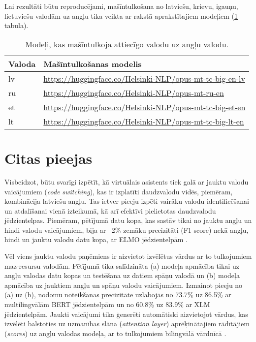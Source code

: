 Lai rezultāti būtu reproducējami, mašīntulkošana no latviešu, krievu, igauņu, lietuviešu valodām uz angļu tika veikta ar \cite{tiedemann-2020} rakstā aprakstītajiem modeļiem (\ref{tab:machine-translation} tabula).



\begin{table}[htbp]
  \centering
  \caption{Modeļi, kas mašīntulkoja attiecīgo valodu uz angļu valodu.}
    \begin{tabular}{ll}\toprule
    Valoda & Mašīntulkošanas modelis \\\midrule
    lv    & \url{https://huggingface.co/Helsinki-NLP/opus-mt-tc-big-en-lv} \\
    ru    & \url{https://huggingface.co/Helsinki-NLP/opus-mt-ru-en} \\
    et    & \url{https://huggingface.co/Helsinki-NLP/opus-mt-tc-big-et-en} \\
    lt    & \url{https://huggingface.co/Helsinki-NLP/opus-mt-tc-big-lt-en} \\\bottomrule
    \end{tabular}%
  \label{tab:machine-translation}%
\end{table}%



\section{Citas pieejas}

Visbeidzot, būtu svarīgi izpētīt, kā virtuālais asistents tiek galā ar jauktu valodu vaicājumiem (\textit{code switching}), kas ir izplatīti daudzvalodu vidēs, piemēram, kombinācija latviešu-angļu. Tas ietver pieeju izpēti vairāku valodu identificēšanai un atdalīšanai vienā izteikumā, kā arī efektīvi pielietotas daudzvalodu jēdzientelpas. Piemēram, pētījumā datu kopa, kas sastāv tikai no jauktu angļu un hindi valodu vaicājumiem, bija ar ~2\% zemāku precizitāti (F1 score) nekā angļu, hindi un jauktu valodu datu kopa, ar ELMO jēdzientelpām \cite{jayarao2018}.

Vēl viens jauktu valodu paņēmiens ir aizvietot izvēlētus vārdus ar to tulkojumiem maz-resursu valodām. Pētījumā \cite{liu2020} tika salīdzināta (a) modeļa apmācība tikai uz angļu valodas datu kopas un testēšana uz datiem spāņu valodā un (b) modeļa apmācība uz jauktiem angļu un spāņu valodu vaicājumiem. Izmainot pieeju no (a) uz (b), nodomu noteikšanas precizitāte uzlabojās no 73.7\% uz 86.5\% ar multilingvālām BERT jēdzientelpām un no 60.8\% uz 83.9\% ar XLM jēdzientelpām. Jaukti vaicājumi tika ģenerēti automātiski aizvietojot vārdus, kas izvēlēti balstoties uz uzmanības slāņa (\textit{attention layer}) aprēķinātajiem rādītājiem (\textit{scores}) uz angļu valodas modeļa, ar to tulkojumiem bilingvālā vārdnīcā \cite{liu2020}.
